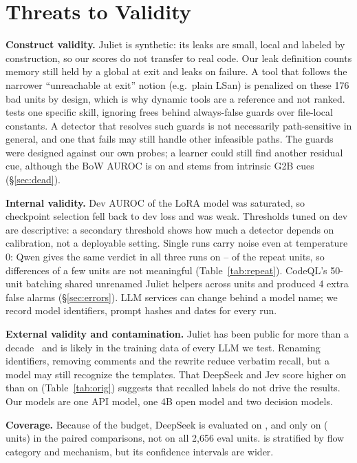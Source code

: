 \section{Threats to Validity}
\label{sec:threats}

\noindent\textbf{Construct validity.}
Juliet is synthetic: its leaks are small, local and labeled by construction, so our scores do not transfer to real code.
Our leak definition counts memory still held by a global at exit and leaks on  failure.
A tool that follows the narrower ``unreachable at exit'' notion (e.g.\ plain LSan) is penalized on these 176 bad units by design, which is why dynamic tools are a reference and not ranked. %
\Dead{} tests one specific skill, ignoring frees behind always-false guards over file-local constants.
A detector that resolves such guards is not necessarily path-sensitive in general, and one that fails may still handle other infeasible paths.
The guards were designed against our own probes; a learner could still find another residual cue, although the BoW AUROC is  on \Dead{} and stems from intrinsic G2B cues (\S\ref{sec:dead}).

\noindent\textbf{Internal validity.}
Dev AUROC of the LoRA model was saturated, so checkpoint selection fell back to dev loss and was weak.
Thresholds tuned on dev are descriptive: a secondary threshold shows how much a detector depends on calibration, not a deployable setting.
Single runs carry noise even at temperature 0: Qwen gives the same verdict in all three runs on -- of the repeat units, so differences of a few units are not meaningful (Table~\ref{tab:repeat}).
CodeQL's 50-unit batching shared unrenamed Juliet helpers across units and produced 4 extra false alarms (\S\ref{sec:errors}).
LLM services can change behind a model name; we record model identifiers, prompt hashes and dates for every run.

\noindent\textbf{External validity and contamination.}
Juliet has been public for more than a decade~\cite{boland2012juliet} and is likely in the training data of every LLM we test.
Renaming identifiers, removing comments and the \Dead{} rewrite reduce verbatim recall, but a model may still recognize the templates.
That DeepSeek and Jev score higher on \Deb{} than on \Orig{} (Table~\ref{tab:orig}) suggests that recalled labels do not drive the results.
Our models are one API model, one 4B open model and two decision models.

\noindent\textbf{Coverage.}
Because of the  budget, DeepSeek is evaluated on \Dead, \Plac{} and \Orig{} only on  ( units) in the paired comparisons, not on all 2,656 eval units.
 is stratified by flow category and mechanism, but its confidence intervals are wider.
